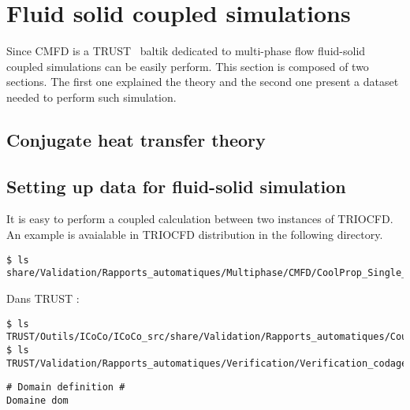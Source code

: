 \chapter{Fluid solid coupled simulations}

Since CMFD is a TRUST~\cite{trustonline} baltik dedicated to multi-phase flow fluid-solid coupled simulations can be easily perform. This section is composed of two sections. The first one explained the theory and the second one present a dataset needed to perform such simulation.

\section{Conjugate heat transfer theory}


\section{Setting up data for fluid-solid simulation}

It is easy to perform a coupled calculation between two instances of TRIOCFD. An example is avaialable in TRIOCFD distribution in the following directory.
\begin{verbatim}
$ ls share/Validation/Rapports_automatiques/Multiphase/CMFD/CoolProp_Single_phase_Debora
\end{verbatim}

Dans TRUST : 
\begin{verbatim}
$ ls TRUST/Outils/ICoCo/ICoCo_src/share/Validation/Rapports_automatiques/CouplageFluideSolide
$ ls TRUST/Validation/Rapports_automatiques/Verification/Verification_codage/conduction_couple
\end{verbatim}
\begin{lstlisting}
# Domain definition #
Domaine dom
\end{lstlisting}
